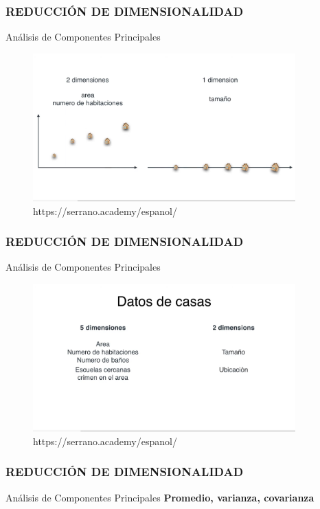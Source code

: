 \documentclass{beamer}
\begin{document}
\begin{frame}
	\frametitle{REDUCCIÓN DE DIMENSIONALIDAD}
	\begin{block}{Análisis de Componentes Principales}	
		\begin{figure}
			\includegraphics[width=0.9\textwidth]{PCA/IMG_3541.jpg}
			\caption{https://serrano.academy/espanol/}
		\end{figure}
	\end{block}
\end{frame}


\begin{frame}
	\frametitle{REDUCCIÓN DE DIMENSIONALIDAD}
	\begin{block}{Análisis de Componentes Principales}	
		\begin{figure}
			\includegraphics[width=0.9\textwidth]{PCA/IMG_3542.jpg}
			\caption{https://serrano.academy/espanol/}
		\end{figure}
	\end{block}
\end{frame}


\begin{frame}
	\frametitle{REDUCCIÓN DE DIMENSIONALIDAD}
	\begin{block}{Análisis de Componentes Principales}	
		\textbf{Promedio, varianza, covarianza}
	\end{block}
\end{frame}
\end{document}

